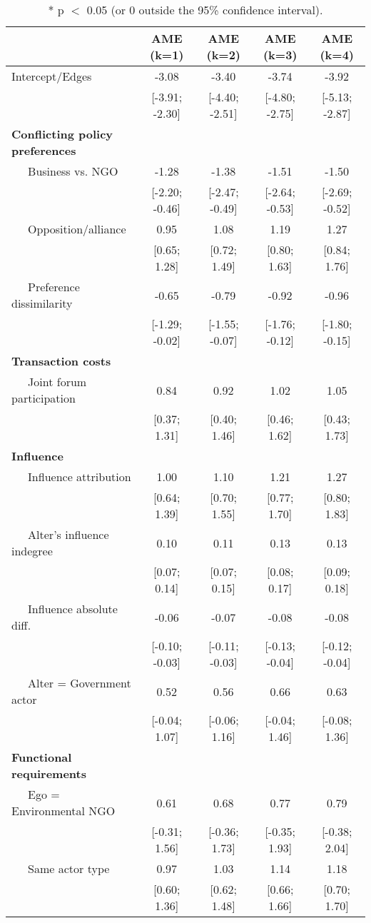 \begin{table}[ht]
\centering
\begingroup\tiny
\begin{tabular}{lcccc}
   & AME (k=1) & AME (k=2) & AME (k=3) & AME (k=4) \\ 
  \hline
\hline
Intercept/Edges & -3.08 & -3.40 & -3.74 & -3.92 \\ 
   & [-3.91; -2.30] & [-4.40; -2.51] & [-4.80; -2.75] & [-5.13; -2.87] \\ 
  \textbf{Conflicting policy preferences} &  &  &  &  \\ 
  $\;\;\;\;$ Business vs. NGO & -1.28 & -1.38 & -1.51 & -1.50 \\ 
   & [-2.20; -0.46] & [-2.47; -0.49] & [-2.64; -0.53] & [-2.69; -0.52] \\ 
  $\;\;\;\;$ Opposition/alliance & 0.95 & 1.08 & 1.19 & 1.27 \\ 
   & [0.65; 1.28] & [0.72; 1.49] & [0.80; 1.63] & [0.84; 1.76] \\ 
  $\;\;\;\;$ Preference dissimilarity & -0.65 & -0.79 & -0.92 & -0.96 \\ 
   & [-1.29; -0.02] & [-1.55; -0.07] & [-1.76; -0.12] & [-1.80; -0.15] \\ 
  \textbf{Transaction costs} &  &  &  &  \\ 
  $\;\;\;\;$ Joint forum participation & 0.84 & 0.92 & 1.02 & 1.05 \\ 
   & [0.37; 1.31] & [0.40; 1.46] & [0.46; 1.62] & [0.43; 1.73] \\ 
  \textbf{Influence} &  &  &  &  \\ 
  $\;\;\;\;$ Influence attribution & 1.00 & 1.10 & 1.21 & 1.27 \\ 
   & [0.64; 1.39] & [0.70; 1.55] & [0.77; 1.70] & [0.80; 1.83] \\ 
  $\;\;\;\;$ Alter's influence indegree & 0.10 & 0.11 & 0.13 & 0.13 \\ 
   & [0.07; 0.14] & [0.07; 0.15] & [0.08; 0.17] & [0.09; 0.18] \\ 
  $\;\;\;\;$ Influence absolute diff. & -0.06 & -0.07 & -0.08 & -0.08 \\ 
   & [-0.10; -0.03] & [-0.11; -0.03] & [-0.13; -0.04] & [-0.12; -0.04] \\ 
  $\;\;\;\;$ Alter = Government actor & 0.52 & 0.56 & 0.66 & 0.63 \\ 
   & [-0.04; 1.07] & [-0.06; 1.16] & [-0.04; 1.46] & [-0.08; 1.36] \\ 
  \textbf{Functional requirements} &  &  &  &  \\ 
  $\;\;\;\;$ Ego = Environmental NGO & 0.61 & 0.68 & 0.77 & 0.79 \\ 
   & [-0.31; 1.56] & [-0.36; 1.73] & [-0.35; 1.93] & [-0.38; 2.04] \\ 
  $\;\;\;\;$ Same actor type & 0.97 & 1.03 & 1.14 & 1.18 \\ 
   & [0.60; 1.36] & [0.62; 1.48] & [0.66; 1.66] & [0.70; 1.70] \\ 
   \hline
\hline
\end{tabular}
\endgroup
\caption{* p $<$ 0.05 (or 0 outside the 95\% confidence interval).} 
\label{tab:regTable_latSpace}
\end{table}
